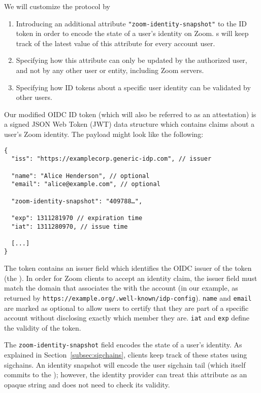 We will customize the protocol by

\begin{enumerate}
\item Introducing an additional attribute \texttt{"zoom-identity-snapshot"} to the ID token in order
    to encode the state of a user’s identity on Zoom. {\idp}s will keep track of the latest value of
    this attribute for every account user.
\item Specifying how this attribute can only be updated by the authorized user, and not by any other
    user or entity, including Zoom servers.
\item Specifying how ID tokens about a specific user identity can be validated by other users.
\end{enumerate}

Our modified OIDC ID token (which will also be referred to as an \idp attestation) is a signed JSON
Web Token (JWT) data structure which contains claims about a user’s Zoom identity. The payload might
look like the following:

\begin{Verbatim}
{
  "iss": "https://examplecorp.generic-idp.com", // issuer

  "name": "Alice Henderson", // optional
  "email": "alice@example.com", // optional

  "zoom-identity-snapshot": "409788…",

  "exp": 1311281970 // expiration time
  "iat": 1311280970, // issue time

  [...]
}
\end{Verbatim}

The token contains an issuer field which identifies the OIDC issuer of the token (the \idp). In
order for Zoom clients to accept an identity claim, the issuer field must match the domain that
associates the \idp with the account (in our example, as returned by
\texttt{https://example.org/.well-known/idp-config}). \texttt{name} and \texttt{email} are marked as
optional to allow users to certify that they are part of a specific account without disclosing
exactly which member they are. \texttt{iat} and \texttt{exp} define the validity of the token.

The \texttt{zoom-identity-snapshot} field encodes the state of a user’s identity. As explained in
Section~\ref{subsec:sigchains}, clients keep track of these states using sigchains. An identity
snapshot will encode the user sigchain tail (which itself commits to the \userID); however, the identity provider can treat
this attribute as an opaque string and does not need to check its validity.

